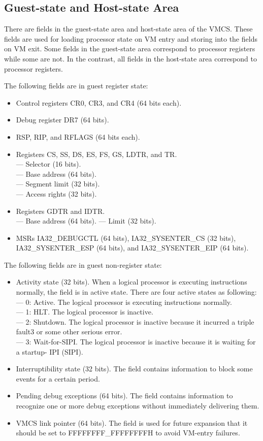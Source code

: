 \documentclass[10pt,draftclsnofoot,journal,compsoc,onecolumn]{IEEEtran}
\begin{document}
\subsection{Guest-state and Host-state Area}
	\par There are fields in the guest-state area and host-state area of the VMCS. These fields are used for loading processor state on VM entry and storing into the fields on VM exit. Some fields in the guest-state area correspond to processor registers while some are not. In the contrast, all fields in the host-state area correspond to processor registers.
    \par The following fields are in guest register state:
\begin{itemize}
  \item Control registers CR0, CR3, and CR4 (64 bits each).
  \item Debug register DR7 (64 bits).
  \item RSP, RIP, and RFLAGS (64 bits each).
  \item Registers CS, SS, DS, ES, FS, GS, LDTR, and TR. \\
  --- Selector (16 bits). \\
  --- Base address (64 bits). \\ 
  --- Segment limit (32 bits). \\
  --- Access rights (32 bits).
  \item Registers GDTR and IDTR. \\
  --- Base address (64 bits).
  --- Limit (32 bits).
  \item MSRs IA32\_DEBUGCTL (64 bits), IA32\_SYSENTER\_CS (32 bits), IA32\_SYSENTER\_ESP (64 bits), and IA32\_SYSENTER\_EIP (64 bits).
  
\end{itemize}
    \par The following fields are in guest non-register state:
\begin{itemize}
  \item Activity state (32 bits). When a logical processor is executing instructions normally, the field is in active state. There are four active states as following: \\
  --- 0: Active. The logical processor is executing instructions normally. \\
  --- 1: HLT. The logical processor is inactive. \\
  --- 2: Shutdown. The logical processor is inactive because it incurred a triple fault3 or some other serious error. \\
  --- 3: Wait-for-SIPI. The logical processor is inactive because it is waiting for a startup- IPI (SIPI).
  \item Interruptibility state (32 bits). The field contains information to block some events for a certain period.
  \item Pending debug exceptions (64 bits). The field contains information to recognize one or more debug exceptions without immediately delivering them.
  \item VMCS link pointer (64 bits). The field is used for future expansion that it should be set to FFFFFFFF\_FFFFFFFFH to avoid VM-entry failures.
\end{itemize}
\end{document}
